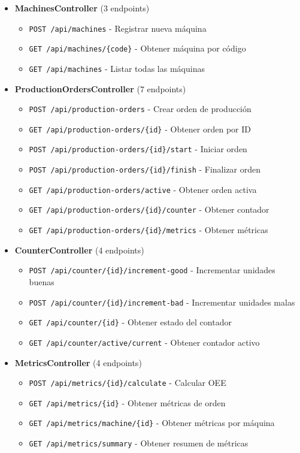 \begin{itemize}
    \item \textbf{MachinesController} (3 endpoints)
    \begin{itemize}
        \item \texttt{POST /api/machines} - Registrar nueva máquina
        \item \texttt{GET /api/machines/\{code\}} - Obtener máquina por código
        \item \texttt{GET /api/machines} - Listar todas las máquinas
    \end{itemize}

    \item \textbf{ProductionOrdersController} (7 endpoints)
    \begin{itemize}
        \item \texttt{POST /api/production-orders} - Crear orden de producción
        \item \texttt{GET /api/production-orders/\{id\}} - Obtener orden por ID
        \item \texttt{POST /api/production-orders/\{id\}/start} - Iniciar orden
        \item \texttt{POST /api/production-orders/\{id\}/finish} - Finalizar orden
        \item \texttt{GET /api/production-orders/active} - Obtener orden activa
        \item \texttt{GET /api/production-orders/\{id\}/counter} - Obtener contador
        \item \texttt{GET /api/production-orders/\{id\}/metrics} - Obtener métricas
    \end{itemize}

    \item \textbf{CounterController} (4 endpoints)
    \begin{itemize}
        \item \texttt{POST /api/counter/\{id\}/increment-good} - Incrementar unidades buenas
        \item \texttt{POST /api/counter/\{id\}/increment-bad} - Incrementar unidades malas
        \item \texttt{GET /api/counter/\{id\}} - Obtener estado del contador
        \item \texttt{GET /api/counter/active/current} - Obtener contador activo
    \end{itemize}

    \item \textbf{MetricsController} (4 endpoints)
    \begin{itemize}
        \item \texttt{POST /api/metrics/\{id\}/calculate} - Calcular OEE
        \item \texttt{GET /api/metrics/\{id\}} - Obtener métricas de orden
        \item \texttt{GET /api/metrics/machine/\{id\}} - Obtener métricas por máquina
        \item \texttt{GET /api/metrics/summary} - Obtener resumen de métricas
    \end{itemize}
\end{itemize}

